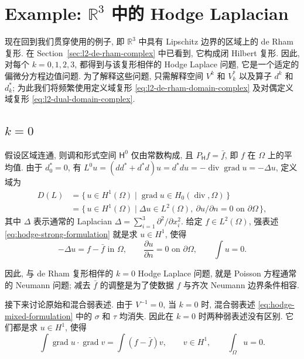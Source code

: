 \section{Example: $\mathbb R^3$ 中的 Hodge Laplacian}\label{sec:hodge-r3}

现在回到我们贯穿使用的例子, 即 $\mathbb R^3$ 中具有 Lipschitz 边界的区域上的 de Rham 复形. 在 Section~\ref{sec:l2-de-rham-complex} 中已看到, 它构成闭 Hilbert 复形. 因此, 对每个 $k=0,1,2,3$, 都得到与该复形相伴的 Hodge Laplace 问题, 它是一个适定的偏微分方程边值问题. 为了解释这些问题, 只需解释空间 $V^k$ 和 $V_k^*$ 以及算子 $d^k$ 和 $d_k^*$; 为此我们将频繁使用定义域复形 \eqref{eq:l2-de-rham-domain-complex} 及对偶定义域复形 \eqref{eq:l2-dual-domain-complex}.

\subsection{$k=0$}\label{subsec:hodge-r3-k0}

假设区域连通, 则调和形式空间 $\mathsf H^0$ 仅由常数构成, 且 $P_{\mathsf H}f=\bar f$, 即 $f$ 在 $\Omega$ 上的平均值. 由于 $d_0^*=0$, 有 $L^0u=(dd^*+d^*d)u=d^*du=-\operatorname{div}\operatorname{grad}u=-\Delta u$, 定义域为
\[
\begin{aligned}
D(L)&=\{\,u\in H^1(\Omega)\mid\operatorname{grad}u\in H_{0}(\operatorname{div},\Omega)\,\}\\
&=\{\,u\in H^1(\Omega)\mid\Delta u\in L^2(\Omega),\ \partial u/\partial n=0\text{ on }\partial\Omega\,\},
\end{aligned}
\]
其中 $\Delta$ 表示通常的 Laplacian $\Delta=\sum_{i=1}^3\partial^2/\partial x_i^2$. 给定 $f\in L^2(\Omega)$, 强表述 \eqref{eq:hodge-strong-formulation} 就是求 $u\in H^1$, 使得
\begin{equation}\label{eq:hodge-r3-neumann-strong}
-\Delta u=f-\bar f\text{ in }\Omega,\qquad\frac{\partial u}{\partial n}=0\text{ on }\partial\Omega,\qquad\int u=0.
\end{equation}

因此, 与 de Rham 复形相伴的 $k=0$ Hodge Laplace 问题, 就是 Poisson 方程通常的 Neumann 问题; 减去 $\bar f$ 的调整是为了使数据 $f$ 与齐次 Neumann 边界条件相容.

接下来讨论原始和混合弱表述. 由于 $V^{-1}=0$, 当 $k=0$ 时, 混合弱表述 \eqref{eq:hodge-mixed-formulation} 中的 $\sigma$ 和 $\tau$ 均消失. 因此在 $k=0$ 时两种弱表述没有区别. 它们都是求 $u\in H^1$, 使得
\begin{equation}\label{eq:hodge-r3-neumann-weak}
\int\operatorname{grad}u\cdot\operatorname{grad}v=\int(f-\bar f)v,\qquad v\in H^1,\qquad\int_\Omega u=0.
\end{equation}

